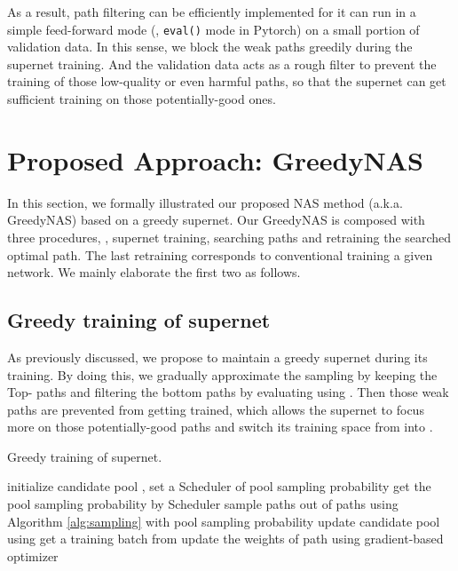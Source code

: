 \documentclass[10pt,twocolumn,letterpaper]{article}
\begin{document}
As a result, path filtering can be efficiently implemented for it can run in a simple feed-forward mode (\eg, \texttt{eval()} mode in Pytorch) on a small portion of validation data. In this sense, we block the weak paths greedily during the supernet training. And the validation data  acts as a rough filter to prevent the training of those low-quality or even harmful paths, so that the supernet can get sufficient training on those potentially-good ones. 


\section{Proposed Approach: GreedyNAS}
In this section, we formally illustrated our proposed NAS method (a.k.a. GreedyNAS) based on a greedy supernet. Our GreedyNAS is composed with three procedures, \ie, supernet training, searching paths and retraining the searched optimal path. The last retraining corresponds to  conventional training a given network. We mainly elaborate the first two as follows. 



\subsection{Greedy training of supernet}
As previously discussed, we propose to maintain a greedy supernet during its training. By doing this, we gradually approximate the sampling  by keeping the Top- paths and filtering the bottom  paths by evaluating using . Then those weak paths are prevented from getting trained, which allows the supernet to focus more on those potentially-good paths and switch its training space from  into .


\begin{algorithm}[tb]
	\caption{Greedy training of supernet.}
	\label{alg}
	\begin{algorithmic}[1]
		\STATE initialize candidate pool , 
		\STATE set a Scheduler of pool sampling probability  
		\FOR{}
		\STATE get the pool sampling probability  by Scheduler
\STATE sample  paths  out of  paths using Algorithm \ref{alg:sampling} with pool sampling probability  
		\STATE update candidate pool  using  
		\FOR{}
		\STATE get a training batch from 
		\STATE update the weights  of path  using gradient-based optimizer
		\ENDFOR 
		\ENDFOR
	\end{algorithmic}
\end{algorithm}
\end{document}
